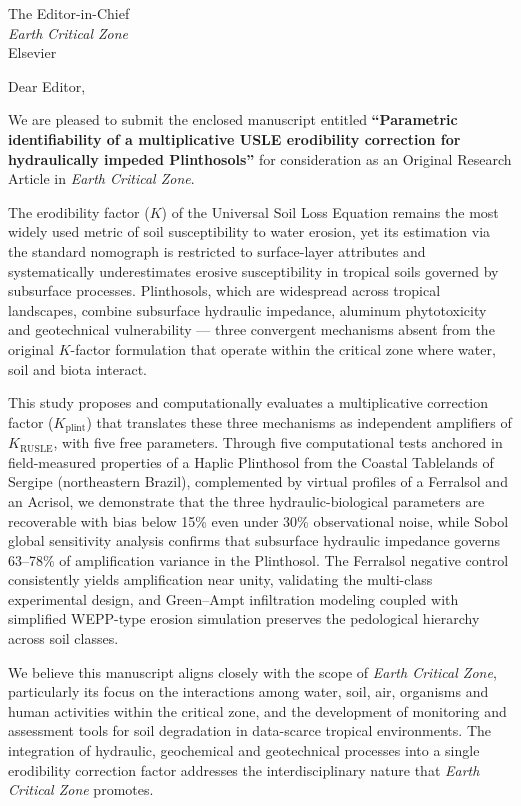 \documentclass[11pt,a4paper]{letter}
\date{\today}
\begin{document}
\begin{letter}{The Editor-in-Chief\\
\textit{Earth Critical Zone}\\
Elsevier}

\opening{Dear Editor,}

We are pleased to submit the enclosed manuscript entitled \textbf{``Parametric identifiability of a multiplicative USLE erodibility correction for hydraulically impeded Plinthosols''} for consideration as an Original Research Article in \textit{Earth Critical Zone}.

The erodibility factor ($K$) of the Universal Soil Loss Equation remains the most widely used metric of soil susceptibility to water erosion, yet its estimation via the standard nomograph is restricted to surface-layer attributes and systematically underestimates erosive susceptibility in tropical soils governed by subsurface processes. Plinthosols, which are widespread across tropical landscapes, combine subsurface hydraulic impedance, aluminum phytotoxicity and geotechnical vulnerability --- three convergent mechanisms absent from the original $K$-factor formulation that operate within the critical zone where water, soil and biota interact.

This study proposes and computationally evaluates a multiplicative correction factor ($K_{\mathrm{plint}}$) that translates these three mechanisms as independent amplifiers of $K_{\mathrm{RUSLE}}$, with five free parameters. Through five computational tests anchored in field-measured properties of a Haplic Plinthosol from the Coastal Tablelands of Sergipe (northeastern Brazil), complemented by virtual profiles of a Ferralsol and an Acrisol, we demonstrate that the three hydraulic-biological parameters are recoverable with bias below 15\% even under 30\% observational noise, while Sobol global sensitivity analysis confirms that subsurface hydraulic impedance governs 63--78\% of amplification variance in the Plinthosol. The Ferralsol negative control consistently yields amplification near unity, validating the multi-class experimental design, and Green--Ampt infiltration modeling coupled with simplified WEPP-type erosion simulation preserves the pedological hierarchy across soil classes.

We believe this manuscript aligns closely with the scope of \textit{Earth Critical Zone}, particularly its focus on the interactions among water, soil, air, organisms and human activities within the critical zone, and the development of monitoring and assessment tools for soil degradation in data-scarce tropical environments. The integration of hydraulic, geochemical and geotechnical processes into a single erodibility correction factor addresses the interdisciplinary nature that \textit{Earth Critical Zone} promotes.


\end{letter}
\end{document}
